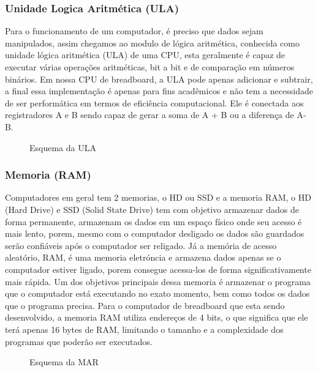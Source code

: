 \subsubsection{Unidade Logica Aritmética  (ULA)}
Para o funcionamento de um computador, é preciso que dados sejam manipulados, assim chegamos ao modulo de lógica aritmética, conhecida como unidade lógica aritmética (ULA) de uma CPU, esta geralmente é capaz de executar várias operações aritméticas, bit a bit e de comparação em números binários. Em nossa CPU de breadboard, a ULA pode apenas adicionar e subtrair, a final essa implementação é apenas para fins acadêmicos e não tem a necessidade de ser performática em termos de eficiência computacional. Ele é conectada aos registradores A e B sendo capaz de gerar a soma de A + B ou a diferença de A-B.

\vspace{1cm}
\begin{figure}[H] \centering 
  \caption{\label{schematics_alu} Esquema da ULA} 
\end{figure}

\subsubsection{Memoria (RAM)}
Computadores em geral tem 2 memorias, o HD ou SSD e a memoria RAM, o HD (Hard Drive) e SSD (Solid State Drive) tem com objetivo armazenar dados de forma permanente, armazenam os dados em um espaço físico onde seu acesso é mais lento, porem, mesmo com o computador desligado os dados são guardados serão confiáveis após o computador ser religado. Já a memória de acesso aleatório, RAM, é uma memoria eletróncia e armazena dados apenas se o computador estiver ligado, porem consegue acessa-los de forma significativamente mais rápida. Um dos objetivos principais dessa memoria é armazenar o programa que o computador está executando no exato momento, bem como todos os dados que o programa precisa. Para o computador de breadboard que esta sendo desenvolvido, a memoria RAM utiliza endereços de 4 bits, o que significa que ele terá apenas 16 bytes de RAM, limitando o tamanho e a complexidade dos programas que poderão ser executados.

\vspace{1cm}
\begin{figure}[H] \centering 
  \caption{\label{schematics_mar} Esquema da MAR} 
\end{figure}

